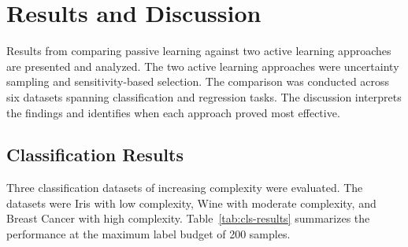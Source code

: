 \documentclass[conference]{IEEEtran}
\begin{document}
\section{Results and Discussion}

Results from comparing passive learning against two active learning approaches are presented and analyzed. The two active learning approaches were uncertainty sampling and sensitivity-based selection. The comparison was conducted across six datasets spanning classification and regression tasks. The discussion interprets the findings and identifies when each approach proved most effective.

\subsection{Classification Results}

Three classification datasets of increasing complexity were evaluated. The datasets were Iris with low complexity, Wine with moderate complexity, and Breast Cancer with high complexity. Table~\ref{tab:cls-results} summarizes the performance at the maximum label budget of 200 samples.
\end{document}
